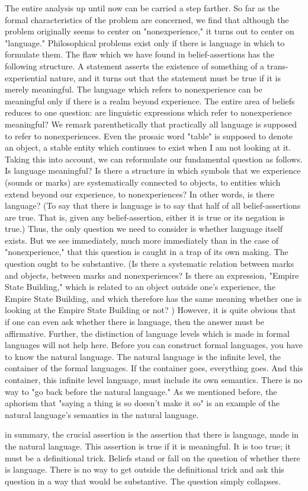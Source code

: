 The entire analysis up until now can be carried a step farther. So far as 
the formal characteristics of the problem are concerned, we find that 
although the problem originally seems to center on "nonexperience," it 
turns out to center on "language." Philosophical problems exist only if there 
is language in which to formulate them. The flaw which we have found in 
belief-assertions has the following structure. A statement asserts the 
existence of something of a trans-experiential nature, and it turns out that 
the statement must be true if it is merely meaningful. The language which 
refers to nonexperience can be meaningful only if there is a realm beyond 
experience. The entire area of beliefs reduces to one question: are linguistic 
expressions which refer to nonexperience meaningful? We remark 
parenthetically that practically all language is supposed to refer to 
nonexperiences. Even the prosaic word "table" is supposed to denote an 
object, a stable entity which continues to exist when I am not looking at it. 
Taking this into account, we can reformulate our fundamental question as 
follows. Is language meaningful? Is there a structure in which symbols that 
we experience (sounds or marks) are systematically connected to objects, to 
entities which extend beyond our experience, to nonexperiences? In other 
words, is there language? (To say that there is language is to say that half of 
all belief-assertions are true. That is, given any belief-assertion, either it is 
true or its negation is true.) Thus, the only question we need to consider is 
whether language itself exists. But we see immediately, much more 
immediately than in the case of "nonexperience," that this question is 
caught in a trap of its own making. The question ought to be substantive. (Is 
there a systematic relation between marks and objects, between marks and 
nonexperiences? Is there an expression, "Empire State Building," which is 
related to an object outside one's experience, the Empire State Building, and 
which therefore has the same meaning whether one is looking at the Empire 
State Building or not? ) However, it is quite obvious that if one can even ask 
whether there is language, then the answer must be affirmative. Further, the 
distinction of language levels which is made in formal languages will not help 
here. Before you can construct formal languages, you have to know the 
natural language. The natural language is the infinite level, the container of 
the formal languages. If the container goes, everything goes. And this 
container, this infinite level language, must include its own semantics. There 
is no way to "go back before the natural language." As we mentioned 
before, the aphorism that "saying a thing is so doesn't make it so" is an 
example of the natural language's semantics in the natural language. 

in summary, the crucial assertion is the assertion that there is language, 
made in the natural language. This assertion is true if it is meaningful. It is 
too true; it must be a definitional trick. Beliefs stand or fall on the question 
of whether there is language. There is no way to get outside the definitional 
trick and ask this question in a way that would be substantive. The question 
simply collapses. 

